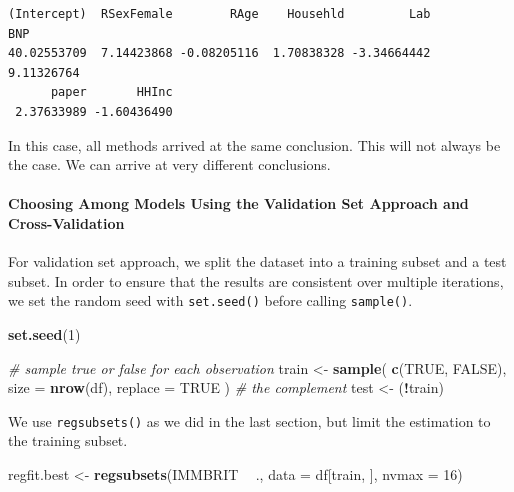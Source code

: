 \documentclass[]{article}
\newenvironment{Shaded}{\begin{snugshade}}{\end{snugshade}}
\newcommand{\CommentTok}[1]{\textcolor[rgb]{0.56,0.35,0.01}{\textit{#1}}}
\newcommand{\DataTypeTok}[1]{\textcolor[rgb]{0.13,0.29,0.53}{#1}}
\newcommand{\DecValTok}[1]{\textcolor[rgb]{0.00,0.00,0.81}{#1}}
\newcommand{\KeywordTok}[1]{\textcolor[rgb]{0.13,0.29,0.53}{\textbf{#1}}}
\newcommand{\NormalTok}[1]{#1}
\newcommand{\OperatorTok}[1]{\textcolor[rgb]{0.81,0.36,0.00}{\textbf{#1}}}
\newcommand{\OtherTok}[1]{\textcolor[rgb]{0.56,0.35,0.01}{#1}}
\newcommand{\StringTok}[1]{\textcolor[rgb]{0.31,0.60,0.02}{#1}}
\let\oldparagraph\paragraph
\renewcommand{\paragraph}[1]{\oldparagraph{#1}\mbox{}}
\begin{document}
\begin{verbatim}
(Intercept)  RSexFemale        RAge    Househld         Lab         BNP 
40.02553709  7.14423868 -0.08205116  1.70838328 -3.34664442  9.11326764 
      paper       HHInc 
 2.37633989 -1.60436490 
\end{verbatim}

In this case, all methods arrived at the same conclusion. This will not always be the case. We can arrive at very different conclusions.

\hypertarget{choosing-among-models-using-the-validation-set-approach-and-cross-validation}{%
\paragraph{Choosing Among Models Using the Validation Set Approach and Cross-Validation}\label{choosing-among-models-using-the-validation-set-approach-and-cross-validation}}

For validation set approach, we split the dataset into a training subset and a test subset. In order to ensure that the results are consistent over multiple iterations, we set the random seed with \texttt{set.seed()} before calling \texttt{sample()}.

\begin{Shaded}
\begin{Highlighting}[]
\KeywordTok{set.seed}\NormalTok{(}\DecValTok{1}\NormalTok{)}

\CommentTok{# sample true or false for each observation}
\NormalTok{train <-}\StringTok{ }\KeywordTok{sample}\NormalTok{( }\KeywordTok{c}\NormalTok{(}\OtherTok{TRUE}\NormalTok{, }\OtherTok{FALSE}\NormalTok{), }\DataTypeTok{size =} \KeywordTok{nrow}\NormalTok{(df), }\DataTypeTok{replace =} \OtherTok{TRUE}\NormalTok{ )}
\CommentTok{# the complement}
\NormalTok{test <-}\StringTok{ }\NormalTok{(}\OperatorTok{!}\NormalTok{train)}
\end{Highlighting}
\end{Shaded}

We use \texttt{regsubsets()} as we did in the last section, but limit the estimation to the training subset.

\begin{Shaded}
\begin{Highlighting}[]
\NormalTok{regfit.best <-}\StringTok{ }\KeywordTok{regsubsets}\NormalTok{(IMMBRIT }\OperatorTok{~}\StringTok{ }\NormalTok{., }\DataTypeTok{data =}\NormalTok{ df[train, ], }\DataTypeTok{nvmax =} \DecValTok{16}\NormalTok{)}
\end{Highlighting}
\end{Shaded}
\end{document}
